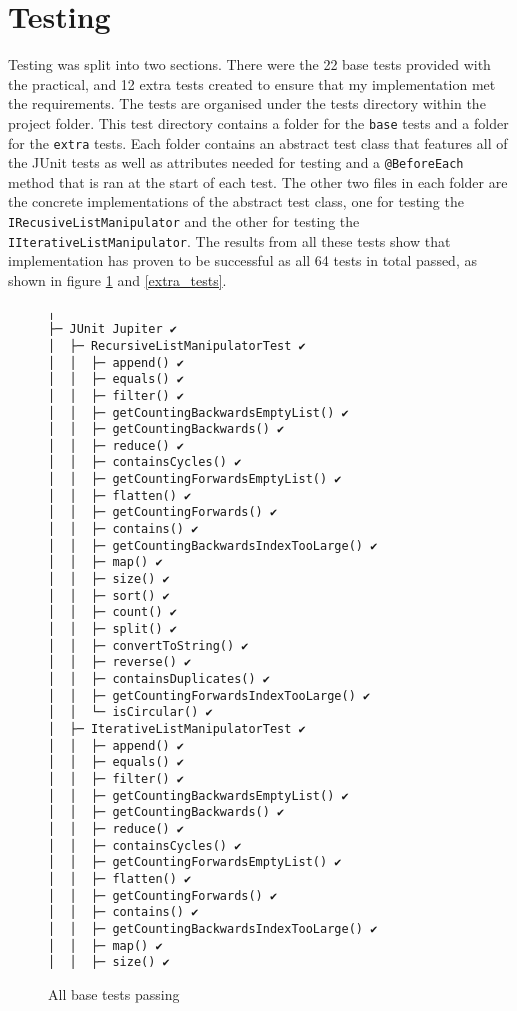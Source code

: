 \documentclass{article}
\begin{document}
\section{Testing}
Testing was split into two sections. There were the 22 base tests provided with the practical, and 12 extra tests created to ensure that my implementation met the requirements. The tests are organised under the tests directory within the project folder. This test directory contains a folder for the \verb+base+ tests and a folder for the \verb+extra+ tests. Each folder contains an abstract test class that features all of the JUnit tests as well as attributes needed for testing and a \verb+@BeforeEach+ method that is ran at the start of each test. The other two files in each folder are the concrete implementations of the abstract test class, one for testing the \verb+IRecusiveListManipulator+ and the other for testing the \verb+IIterativeListManipulator+. The results from all these tests show that implementation has proven to be successful as all 64 tests in total passed, as shown in figure \ref{base_tests} and \ref{extra_tests}.

\begin{figure}[H]
\centering \begin{BVerbatim}[fontsize=\small]
╷
├─ JUnit Jupiter ✔
│  ├─ RecursiveListManipulatorTest ✔
│  │  ├─ append() ✔
│  │  ├─ equals() ✔
│  │  ├─ filter() ✔
│  │  ├─ getCountingBackwardsEmptyList() ✔
│  │  ├─ getCountingBackwards() ✔
│  │  ├─ reduce() ✔
│  │  ├─ containsCycles() ✔
│  │  ├─ getCountingForwardsEmptyList() ✔
│  │  ├─ flatten() ✔
│  │  ├─ getCountingForwards() ✔
│  │  ├─ contains() ✔
│  │  ├─ getCountingBackwardsIndexTooLarge() ✔
│  │  ├─ map() ✔
│  │  ├─ size() ✔
│  │  ├─ sort() ✔
│  │  ├─ count() ✔
│  │  ├─ split() ✔
│  │  ├─ convertToString() ✔
│  │  ├─ reverse() ✔
│  │  ├─ containsDuplicates() ✔
│  │  ├─ getCountingForwardsIndexTooLarge() ✔
│  │  └─ isCircular() ✔
│  ├─ IterativeListManipulatorTest ✔
│  │  ├─ append() ✔
│  │  ├─ equals() ✔
│  │  ├─ filter() ✔
│  │  ├─ getCountingBackwardsEmptyList() ✔
│  │  ├─ getCountingBackwards() ✔
│  │  ├─ reduce() ✔
│  │  ├─ containsCycles() ✔
│  │  ├─ getCountingForwardsEmptyList() ✔
│  │  ├─ flatten() ✔
│  │  ├─ getCountingForwards() ✔
│  │  ├─ contains() ✔
│  │  ├─ getCountingBackwardsIndexTooLarge() ✔
│  │  ├─ map() ✔
│  │  ├─ size() ✔
\end{BVerbatim}
\caption{All base tests passing}
\label{base_tests}
\end{figure}
\end{document}
